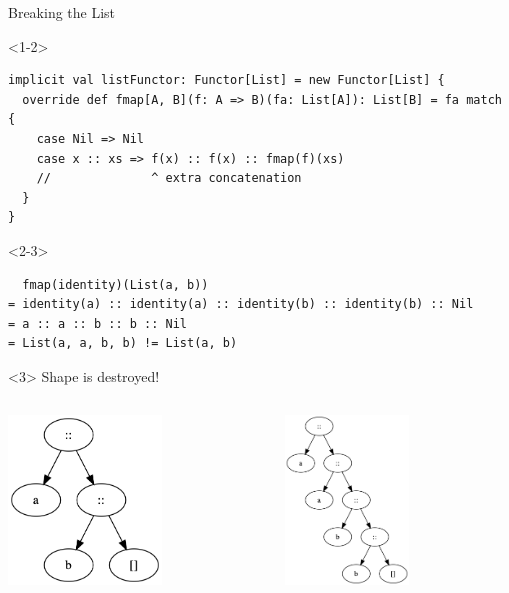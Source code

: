 \documentclass[presentation,aspectratio=169,smaller]{beamer}
\begin{document}
\begin{frame}[label={sec:org6146d17},fragile,t]{Breaking the List}
 \begin{onlyenv}<1-2>
\begin{verbatim}
implicit val listFunctor: Functor[List] = new Functor[List] {
  override def fmap[A, B](f: A => B)(fa: List[A]): List[B] = fa match {
    case Nil => Nil
    case x :: xs => f(x) :: f(x) :: fmap(f)(xs)
    //              ^ extra concatenation
  }
}
\end{verbatim}
\end{onlyenv}

\begin{onlyenv}<2-3>
\begin{verbatim}
  fmap(identity)(List(a, b))
= identity(a) :: identity(a) :: identity(b) :: identity(b) :: Nil
= a :: a :: b :: b :: Nil
= List(a, a, b, b) != List(a, b)
\end{verbatim}
\end{onlyenv}

\begin{onlyenv}<3>
Shape is destroyed!

\begin{columns}
\begin{column}[t]{0.5\columnwidth}
\begin{center}
\includegraphics[height=4.5cm]{.dot/functor-list-broken-1.png}
\end{center}
\end{column}

\begin{column}[t]{0.5\columnwidth}
\begin{center}
\includegraphics[height=4.5cm]{.dot/functor-list-broken-2.png}
\end{center}
\end{column}
\end{columns}
\end{onlyenv}
\end{frame}
\end{document}
